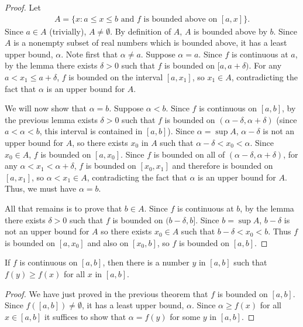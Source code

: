 \documentclass[12pt,letterpaper,reqno]{article}
\numberwithin{equation}{section}
\begin{document}
{\begin{proof}
	Let
	\begin{align*}
		A=\{x:a \leq x \leq b \text{ and } f \text{ is bounded above on } [a,x]\}.
	\end{align*}
	Since $a \in A$ (trivially), $A \neq \emptyset$. By definition of $A$, $A$ is bounded above by $b$. Since $A$ is a nonempty subset of real numbers which is bounded above, it has a least upper bound, $\alpha$. Note first that $\alpha \neq a$. Suppose $\alpha=a$. Since $f$ is continuous at $a$, by the lemma there exists $\delta>0$ such that $f$ is bounded on $[a,a+\delta)$. For any $a < x_1 \leq a+\delta$, $f$ is bounded on the interval $[a,x_1]$, so $x_1 \in A$, contradicting the fact that $\alpha$ is an upper bound for $A$.
	
We will now show that $\alpha=b$. Suppose $\alpha<b$. Since $f$ is continuous on $[a,b]$, by the previous lemma exists $\delta>0$ such that $f$ is bounded on $(\alpha-\delta,\alpha+\delta)$ (since $a<\alpha<b$, this interval is contained in $[a,b]$). Since $\alpha=\sup A$, $\alpha-\delta$ is not an upper bound for $A$, so there exists $x_0$ in $A$ such that $\alpha-\delta<x_0<\alpha$. Since $x_0 \in A$, $f$ is bounded on $[a,x_0]$. Since $f$ is bounded on all of $(\alpha-\delta,\alpha+\delta)$, for any $\alpha<x_1<\alpha+\delta$, $f$ is bounded on $[x_0,x_1]$ and therefore is bounded on $[a,x_1]$, so $\alpha<x_1 \in A$,  contradicting the fact that $\alpha$ is an upper bound for $A$. Thus, we must have $\alpha=b$.

All that remains is to prove that $b \in A$. Since $f$ is continuous at $b$, by the lemma there exists $\delta>0$ such that $f$ is bounded on $(b-\delta,b]$. Since $b=\sup A$, $b-\delta$ is not an upper bound for $A$ so there exists $x_0 \in A$ such that $b-\delta<x_0<b$. Thus $f$ is bounded on $[a,x_0]$ and also on $[x_0,b]$, so $f$ is bounded on $[a,b]$.
\end{proof}

\begin{thm}
	If $f$ is continuous on $[a,b]$, then there is a number $y$ in $[a,b]$ such that $f(y) \geq f(x)$ for all $x$ in $[a,b]$.
\end{thm}

\begin{proof}
	We have just proved in the previous theorem that $f$ is bounded on $[a,b]$. Since $f([a,b]) \neq \emptyset$, it has a least upper bound, $\alpha$. Since $\alpha \geq f(x)$ for all $x \in [a,b]$ it suffices to show that $\alpha=f(y)$ for some $y$ in $[a,b]$.
	

\end{proof}}
\end{document}
